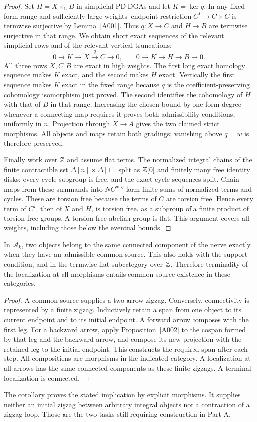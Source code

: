 \begin{proof}
Set $H=X\times_C B$ in simplicial PD DGAs and let $K=\ker q$.
In any fixed form range and sufficiently large weights, endpoint
restriction $C^I\to C\times C$ is termwise surjective by
Lemma~\ref{A001}. Thus $q:X\to C$ and $H\to B$ are termwise
surjective in that range. We obtain short exact sequences of the
relevant simplicial rows and of the relevant vertical truncations:
\[
 0\to K\to X\xrightarrow{q}C\to0,
 \qquad 0\to K\to H\to B\to0.
\]
All three rows $X,C,B$ are exact in high weights. The first long exact
homology sequence makes $K$ exact, and the second makes $H$ exact.
Vertically the first sequence makes $K$ exact in the fixed range
because $q$ is the coefficient-preserving cohomology isomorphism
just proved. The second identifies the cohomology of $H$ with that
of $B$ in that range. Increasing the chosen bound by one form degree
whenever a connecting map requires it proves both admissibility
conditions, uniformly in $n$. Projection through $X\to A$ gives
the two claimed strict morphisms. All objects and maps retain both
gradings; vanishing above $q=w$ is therefore preserved.

Finally work over $\mathbb Z$ and assume flat terms. The normalized integral
chains of the finite contractible set $\Delta[n]\times\Delta[1]$
split as $\mathbb Z[0]$ and finitely many free identity disks: every cycle
subgroup is free, and the exact cycle sequences split. Chain maps
from these summands into $NC^{w,q}$ form finite sums of normalized
terms and cycles. These are torsion free because the terms of $C$
are torsion free. Hence every term of $C^I$, then of $X$ and $H$,
is torsion free, as a subgroup of a finite product of torsion-free
groups. A torsion-free abelian group is flat. This argument covers
all weights, including those below the eventual bounds.
\end{proof}

\begin{corollary}
\label{A003}
In $\mathcal A_k$, two objects belong to the same connected component
of the nerve exactly when they have an admissible common source.
This also holds with the support condition, and in the termwise-flat
subcategory over $\mathbb Z$. Therefore terminality of the localization at
all morphisms entails common-source existence in these categories.
\end{corollary}
\begin{proof}
A common source supplies a two-arrow zigzag. Conversely, connectivity
is represented by a finite zigzag. Inductively retain a span from
one object to its current endpoint and to its initial endpoint.
A forward arrow composes with the first leg. For a backward arrow,
apply Proposition~\ref{A002} to the cospan formed by that leg and
the backward arrow, and compose its new projection with the retained
leg to the initial endpoint. This constructs the required span after
each step. All compositions are morphisms in the indicated category.
A localization at all arrows has the same connected components as
these finite zigzags. A terminal localization is connected.
\end{proof}

The corollary proves the stated implication by explicit morphisms.
It supplies neither an initial zigzag between arbitrary integral
objects nor a contraction of a zigzag loop. Those are the two tasks
still requiring construction in Part A.

